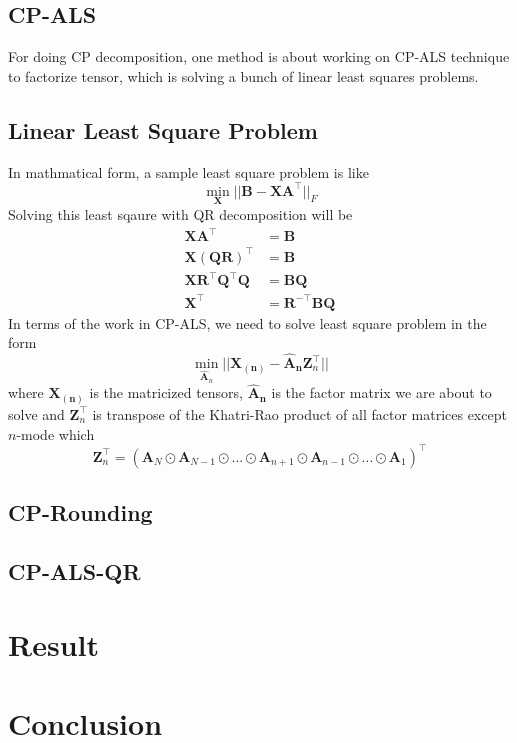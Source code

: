 \documentclass{article}
\newcommand{\mat}[1]{\mathbf{#1}}
\begin{document}
\subsection*{CP-ALS}
For doing CP decomposition, one method is about working on CP-ALS technique to factorize tensor, which
is solving a bunch of linear least squares problems.
\subsection*{Linear Least Square Problem}
In mathmatical form, a sample least square problem is like 
$$\min_{\mat{X}}||\mat{B} - \mat{X}\mat{A}^\top||_{F}$$
Solving this least sqaure with QR decomposition will be
\begin{align}
  \mat{X}\mat{A}^\top &= \mat{B} \nonumber \\
  \mat{X}(\mat{Q}\mat{R})^\top &= \mat{B} \nonumber \\
  \mat{X}\mat{R}^\top\mat{Q}^\top\mat{Q} &= \mat{B}\mat{Q} \nonumber \\
  \mat{X}^\top &= \mat{R}^{-\top}\mat{B}\mat{Q} \nonumber
\end{align} 
In terms of the work in CP-ALS, we need to solve least square problem in the form 
$$\min_{\mat{\hat{A}}_n}||\mat{X_{(n)}} - {\mat{\hat{A}_n}}\mat{Z}^\top_n ||$$
where $\mat{X_{(n)}}$ is the matricized tensors, $\mat{\hat{A}_n}$ is the factor matrix we are about to solve and 
$\mat{Z}^\top_n$ is transpose of the Khatri-Rao product of all factor matrices except $n$-mode which
$$\mat{Z}^\top_n = (\mat{A}_N \odot \mat{A}_{N-1} \odot \dots \odot \mat{A}_{n+1} \odot \mat{A}_{n-1} \odot \dots \odot \mat{A}_1)^\top $$ 
\subsection*{CP-Rounding}

\subsection*{CP-ALS-QR}




\section*{Result}

\section*{Conclusion}
\end{document}
